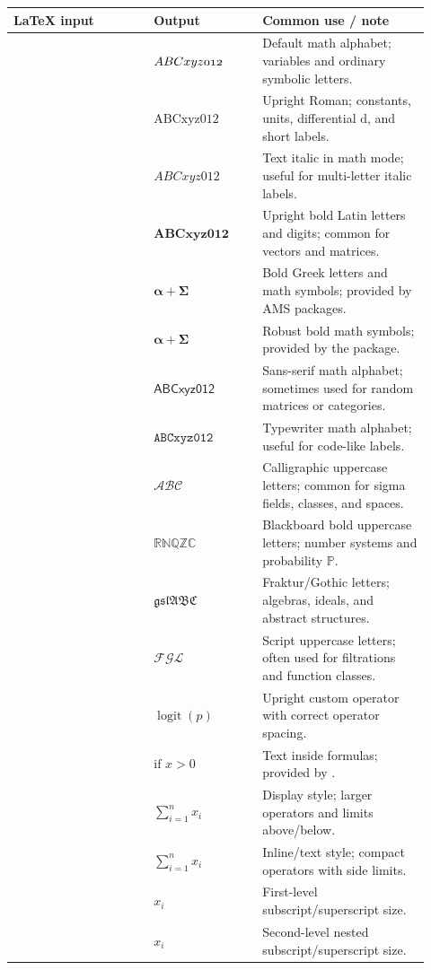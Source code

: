 \documentclass[10pt]{article}
\newcommand{\code}[1]{\texttt{\detokenize{#1}}}
\newenvironment{styletable}
{\small\begin{longtable}{
  >{\raggedright\arraybackslash}p{0.31\linewidth}
  >{\centering\arraybackslash}p{0.24\linewidth}
  >{\raggedright\arraybackslash}p{0.37\linewidth}}
  \toprule
  \textbf{LaTeX input} & \textbf{Output} & \textbf{Common use / note}\\
  \midrule
  \endhead}
{\bottomrule\end{longtable}}
\begin{document}
\begin{styletable}
\code{\mathnormal{ABCxyz012}} & $\mathnormal{ABCxyz012}$ & Default math alphabet; variables and ordinary symbolic letters.\\
\code{\mathrm{ABCxyz012}} & $\mathrm{ABCxyz012}$ & Upright Roman; constants, units, differential \(\mathrm{d}\), and short labels.\\
\code{\mathit{ABCxyz012}} & $\mathit{ABCxyz012}$ & Text italic in math mode; useful for multi-letter italic labels.\\
\code{\mathbf{ABCxyz012}} & $\mathbf{ABCxyz012}$ & Upright bold Latin letters and digits; common for vectors and matrices.\\
\code{\boldsymbol{\alpha+\Sigma}} & $\boldsymbol{\alpha+\Sigma}$ & Bold Greek letters and math symbols; provided by AMS packages.\\
\code{\bm{\alpha+\Sigma}} & $\bm{\alpha+\Sigma}$ & Robust bold math symbols; provided by the \code{bm} package.\\
\code{\mathsf{ABCxyz012}} & $\mathsf{ABCxyz012}$ & Sans-serif math alphabet; sometimes used for random matrices or categories.\\
\code{\mathtt{ABCxyz012}} & $\mathtt{ABCxyz012}$ & Typewriter math alphabet; useful for code-like labels.\\
\code{\mathcal{ABC}} & $\mathcal{ABC}$ & Calligraphic uppercase letters; common for sigma fields, classes, and spaces.\\
\code{\mathbb{RNQZC}} & $\mathbb{RNQZC}$ & Blackboard bold uppercase letters; number systems and probability \(\mathbb{P}\).\\
\code{\mathfrak{gslABC}} & $\mathfrak{gslABC}$ & Fraktur/Gothic letters; algebras, ideals, and abstract structures.\\
\code{\mathscr{FGL}} & $\mathscr{FGL}$ & Script uppercase letters; often used for filtrations and function classes.\\
\code{\operatorname{logit}(p)} & $\operatorname{logit}(p)$ & Upright custom operator with correct operator spacing.\\
\code{\text{if } x>0} & $\text{if } x>0$ & Text inside formulas; provided by \code{amsmath}.\\
\code{\displaystyle \sum_{i=1}^n x_i} & $\displaystyle \sum_{i=1}^n x_i$ & Display style; larger operators and limits above/below.\\
\code{\textstyle \sum_{i=1}^n x_i} & $\textstyle \sum_{i=1}^n x_i$ & Inline/text style; compact operators with side limits.\\
\code{\scriptstyle x_i} & $\scriptstyle x_i$ & First-level subscript/superscript size.\\
\code{\scriptscriptstyle x_i} & $\scriptscriptstyle x_i$ & Second-level nested subscript/superscript size.\\
\end{styletable}
\end{document}
